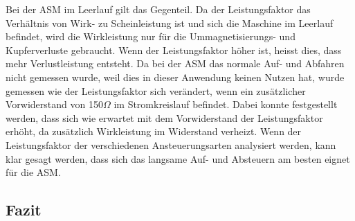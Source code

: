 Bei der ASM im Leerlauf gilt das Gegenteil. Da der Leistungsfaktor das Verhältnis von Wirk- zu Scheinleistung ist und sich die Maschine im Leerlauf befindet, wird die Wirkleistung nur für die Ummagnetisierungs- und Kupferverluste gebraucht. Wenn der Leistungsfaktor höher ist, heisst dies, dass mehr Verlustleistung entsteht. Da bei der ASM das normale Auf- und Abfahren nicht gemessen wurde, weil dies in dieser Anwendung keinen Nutzen hat, wurde gemessen wie der Leistungsfaktor sich verändert, wenn ein zusätzlicher Vorwiderstand von 150$\Omega$ im Stromkreislauf befindet. Dabei konnte festgestellt werden, dass sich wie erwartet mit dem Vorwiderstand der Leistungsfaktor erhöht, da zusätzlich Wirkleistung im Widerstand verheizt. Wenn der Leistungsfaktor der verschiedenen Ansteuerungsarten analysiert werden, kann klar gesagt werden, dass sich das langsame Auf- und  Absteuern am besten eignet für die ASM.


\newpage
\subsection{Fazit}

